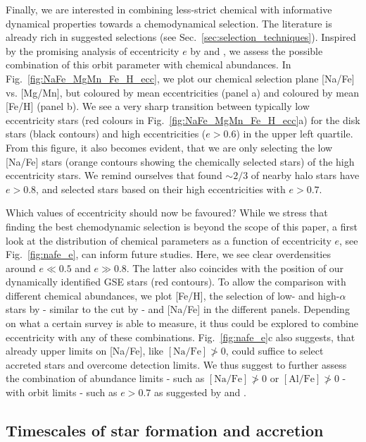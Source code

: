 \documentclass[fleqn,usenatbib]{mnras}
\begin{document}
Finally, we are interested in combining less-strict chemical with informative dynamical properties towards a chemodynamical selection. The literature is already rich in suggested selections (see Sec.~\ref{sec:selection_techniques}). Inspired by the promising analysis of eccentricity $e$ by \citet{Mackereth2019} and \citet{Naidu2020}, we assess the possible combination of this orbit parameter with chemical abundances. In Fig.~\ref{fig:NaFe_MgMn_Fe_H_ecc}, we plot our chemical selection plane [Na/Fe] vs. [Mg/Mn], but coloured by mean eccentricities (panel a) and coloured by mean [Fe/H] (panel b). We see a very sharp transition between typically low eccentricity stars (red colours in Fig.~\ref{fig:NaFe_MgMn_Fe_H_ecc}a) for the disk stars (black contours) and high eccentricities ($e > 0.6$) in the upper left quartile. From this figure, it also becomes evident, that we are only selecting the low [Na/Fe] stars (orange contours showing the chemically selected stars) of the high eccentricity stars. We remind ourselves that \citet{Mackereth2019} found $\sim 2/3$ of nearby halo stars have $e > 0.8$, and \citet{Naidu2020} selected stars based on their high eccentricities with $e > 0.7$.

Which values of eccentricity should now be favoured? While we stress that finding the best chemodynamic selection is beyond the scope of this paper, a first look at the distribution of chemical parameters as a function of eccentricity $e$, see Fig.~\ref{fig:nafe_e}, can inform future studies. Here, we see clear overdensities around $e \ll 0.5$ and $e \gg 0.8$. The latter also coincides with the position of our dynamically identified GSE stars (red contours). To allow the comparison with different chemical abundances, we plot [Fe/H], the selection of low- and high-$\alpha$ stars by \citet{Naidu2020} - similar to the cut by \citet{Nissen2010} - and [Na/Fe] in the different panels. Depending on what a certain survey is able to measure, it thus could be explored to combine eccentricity with any of these combinations. Fig.~\ref{fig:nafe_e}c also suggests, that already upper limits on [Na/Fe], like $\mathrm{[Na/Fe]} \not> 0$, could suffice to select accreted stars and overcome detection limits. We thus suggest to further assess the combination of abundance limits - such as $\mathrm{[Na/Fe]} \not> 0$ or $\mathrm{[Al/Fe]} \not> 0$ - with orbit limits - such as $e > 0.7$ as suggested by \citet{Mackereth2019} and \citet{Naidu2020}.

\subsection{Timescales of star formation and accretion} \label{sec:age_timescale}
\end{document}
